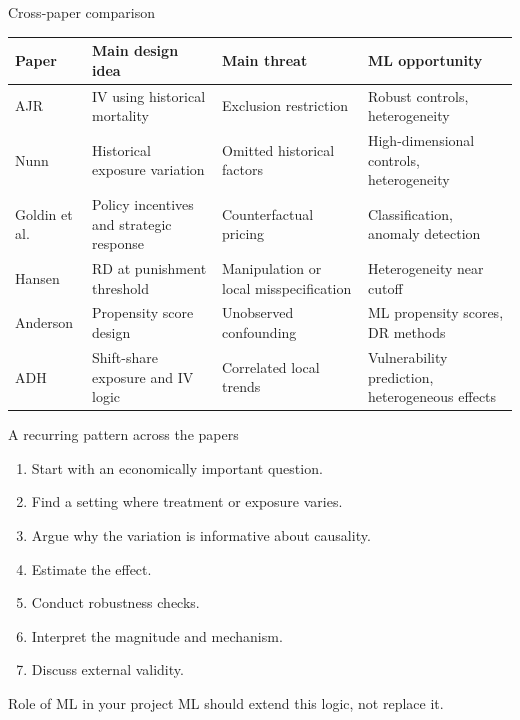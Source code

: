 \documentclass[aspectratio=169,11pt]{beamer}
\begin{document}
\begin{frame}{Cross-paper comparison}
\begin{center}
\tiny
\begin{tabular}{p{}p{}p{}p{}}
\toprule
Paper & Main design idea & Main threat & ML opportunity \\
\midrule
AJR & IV using historical mortality & Exclusion restriction & Robust controls, heterogeneity \\
Nunn & Historical exposure variation & Omitted historical factors & High-dimensional controls, heterogeneity \\
Goldin et al. & Policy incentives and strategic response & Counterfactual pricing & Classification, anomaly detection \\
Hansen & RD at punishment threshold & Manipulation or local misspecification & Heterogeneity near cutoff \\
Anderson & Propensity score design & Unobserved confounding & ML propensity scores, DR methods \\
ADH & Shift-share exposure and IV logic & Correlated local trends & Vulnerability prediction, heterogeneous effects \\
\bottomrule
\end{tabular}
\end{center}
\end{frame}

\begin{frame}{A recurring pattern across the papers}
\begin{enumerate}
  \item Start with an economically important question.
  \item Find a setting where treatment or exposure varies.
  \item Argue why the variation is informative about causality.
  \item Estimate the effect.
  \item Conduct robustness checks.
  \item Interpret the magnitude and mechanism.
  \item Discuss external validity.
\end{enumerate}
\begin{block}{Role of ML in your project}
ML should extend this logic, not replace it.
\end{block}
\end{frame}
\end{document}
